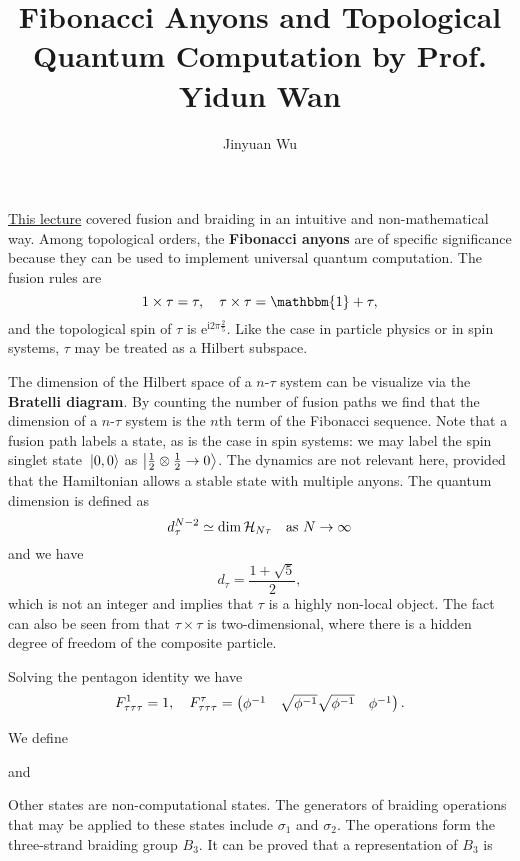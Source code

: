 \documentclass[hyperref, a4paper]{article}
\title{Fibonacci Anyons and Topological Quantum Computation by Prof. Yidun Wan}
\author{Jinyuan Wu}
\newcommand*{\ii}{\mathrm{i}}
\newcommand*{\ee}{\mathrm{e}}
\newcommand*{\concept}[1]{{\textbf{#1}}}
\def\\{}%
\begin{document}
\maketitle

\href{./2021-10-29}{This lecture} covered fusion and braiding in an intuitive and non-mathematical way.
Among topological orders, the \concept{Fibonacci anyons} are of specific significance because they can be 
used to implement universal quantum computation.
The fusion rules are 
\begin{equation}
    1 \times \tau = \tau, \quad \tau \times \tau = \mathbbm{1} + \tau,
\end{equation}
and the topological spin of $\tau$ is $\ee^{\ii 2 \pi \frac{2}{5}}$.
Like the case in particle physics or in spin systems, $\tau$ may be treated as a Hilbert subspace.

The dimension of the Hilbert space of a $n$-$\tau$ system can be visualize via the \concept{Bratelli diagram}.
By counting the number of fusion paths we find that the dimension of a $n$-$\tau$ system is the $n$th term of 
the Fibonacci sequence. 
Note that a fusion path labels a state, as is the case in spin systems: we may label the spin singlet state $\ket*{0, 0}$ as $\ket{\frac{1}{2} \otimes \frac{1}{2} \to 0}$.
The dynamics are not relevant here, provided that the Hamiltonian allows a stable state with multiple anyons.
The quantum dimension is defined as 
\begin{equation}
    d_\tau^{N-2} \simeq \dim \mathcal{H}_{N \tau} \text{\quad as $N \to \infty$}
\end{equation} 
and we have 
\begin{equation}
    d_\tau = \frac{1 + \sqrt{5}}{2},
\end{equation}
which is not an integer and implies that $\tau$ is a highly non-local object.
The fact can also be seen from that $\tau \times \tau$ is two-dimensional, where there is a hidden degree of freedom of the composite particle.

Solving the pentagon identity we have 
\begin{equation}
    F^1_{\tau\tau\tau} = 1, \quad F^\tau_{\tau\tau\tau} = \pmqty{\phi^{-1} & \sqrt{\phi^{-1}} \\ \sqrt{\phi^{-1}} & \phi^{-1}}.
\end{equation}

We define 

and 

Other states are non-computational states.
The generators of braiding operations that may be applied to these states include $\sigma_1$ and $\sigma_2$.
The operations form the three-strand braiding group $B_3$.
It can be proved that a representation of $B_3$ is %
\end{document}
